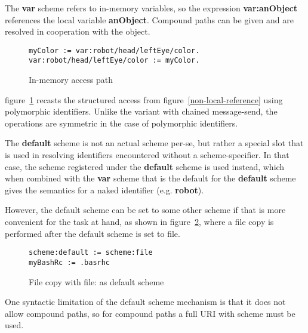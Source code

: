 \documentclass[preprint,authoryear]{acm_proc_article-sp}
\begin{document}
The {\bf var} scheme refers to in-memory variables, so the expression
 {\bf var:anObject} references the
local variable {\bf anObject}.   Compound paths can be given and are resolved in
cooperation with the object.

\begin{figure}[htbp]
\begin{center}
\begin{small}
\begin{verbatim}
myColor := var:robot/head/leftEye/color.
var:robot/head/leftEye/color := myColor.
\end{verbatim}
\end{small}
\caption{In-memory access path}
\label{in-memory-path}
\end{center}
\end{figure}

figure~\ref{in-memory-path} recasts the structured access from 
figure~\ref{non-local-reference} using polymorphic identifiers.  Unlike the variant
with chained message-send, the operations are symmetric in the case of polymorphic identifiers.


The {\bf default} scheme is not an actual scheme per-se, but rather a special slot
that is used in resolving identifiers encountered without a scheme-specifier.
In that case, the scheme registered under the {\bf default} scheme is used
instead, which when combined with the {\bf var} scheme that is the default
for the {\bf default} scheme gives the semantics for a naked identifier (e.g. {\bf robot}).


However, the default scheme can be set to some other scheme if that is more
convenient for the task at hand, as shown in figure~\ref{file-as-default-scheme},
where a file copy is performed after the default scheme is set to file.

\begin{figure}[htbp]
\begin{center}
\begin{small}
\begin{verbatim}
scheme:default := scheme:file
myBashRc := .basrhc
\end{verbatim}
\end{small}
\caption{File copy with file: as default scheme}
\label{file-as-default-scheme}
\end{center}
\end{figure}

One syntactic limitation of the default scheme mechanism is that it does not allow
compound paths, so for compound paths a full URI with scheme must be used.
\end{document}
